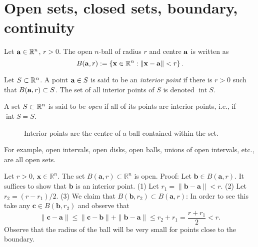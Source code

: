 \section{Open sets, closed sets, boundary, continuity}

Let \(\aa \in \bR^n\), \(r>0\).
The open \(n\)-ball of radius \(r\) and centre \(\aa\) is written as
\[
    B(\aa,r):= \left\{ \xx \in \bR^n : \norm{\xx - \aa}< r  \right\}.
\]

\begin{definition}
    Let \(S \subset \bR^n\).
    A point \(\aa \in S\) is said to be an \emph{interior point} if there is \(r>0\) such that \( B(\aa,r) \subset S\).
    The set of all interior points of \(S\) is denoted \(\operatorname{int} S\).
\end{definition}

\begin{definition}
    A set \(S \subset \bR^n\) is said to be \emph{open} if all of its points are interior points, i.e., if \(\operatorname{int} S = S\).
\end{definition}



\begin{figure}[htbp]
    \begin{center}
        \caption{Interior points are the centre of a ball contained within the set.}
    \end{center}
\end{figure}


For example,
open intervals, open disks, open balls, unions of open intervals, etc., are all open sets.

\begin{example*}
    Let $r>0$, $\mathbf{x} \in \mathbb{R}^n$. The set $B(\mathbf{a},r) \subset \mathbb{R}^n$ is open.
    Proof:
    Let $\mathbf{b} \in B(\mathbf{a},r)$. It suffices to show that $\mathbf{b}$ is an interior point.
    (1) Let $r_1 = \| \mathbf{b} - \mathbf{a} \| < r$.
    (2) Let $r_2 = (r - r_1)/2$.
    (3) We claim that $B(\mathbf{b},r_2) \subset B(\mathbf{a},r)$:
    In order to see this take any $\mathbf{c} \in B(\mathbf{b},r_2)$ and observe that
    $$\| \mathbf{c} - \mathbf{a} \| \leq \| \mathbf{c} - \mathbf{b} \|  + \| \mathbf{b} - \mathbf{a} \| \leq r_2 + r_1 = \frac{r + r_1}{2} < r.$$
    Observe that the radius of the ball will be very small for points close to the boundary.
\end{example*}




